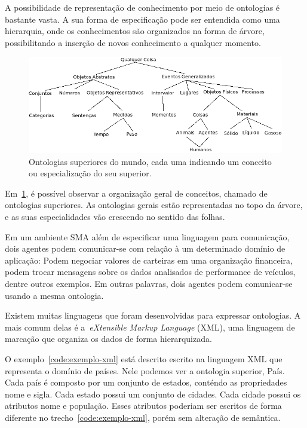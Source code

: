 A possibilidade de representação de conhecimento por meio de ontologias é bastante vasta. A sua forma de especificação pode ser entendida como uma hierarquia, onde os conhecimentos são organizados na forma de árvore, possibilitando a inserção de novos conhecimento a qualquer momento.

\begin{figure}
	\centering
	\includegraphics[scale=0.65]{images/arvore-ontologia.png}
	\caption{Ontologias superiores do mundo, cada uma indicando um conceito ou especialização do seu superior.}
	\label{fig:arvore-ontologia}
\end{figure}

Em~\ref{fig:arvore-ontologia}, é possível observar a organização geral de conceitos, chamado de ontologias superiores. As ontologias gerais estão representadas no topo da árvore, e as suas especialidades vão crescendo no sentido das folhas.

Em um ambiente SMA além de especificar uma linguagem para comunicação, dois agentes podem comunicar-se com relação à um determinado domínio de aplicação: Podem negociar valores de carteiras em uma organização financeira, podem trocar mensagens sobre os dados analisados de performance de veículos, dentre outros exemplos. Em outras palavras, dois agentes podem comunicar-se usando a mesma ontologia.

Existem muitas linguagens que foram desenvolvidas para expressar ontologias. A mais comum delas é a~\emph{eXtensible Markup Language} (XML), uma linguagem de marcação que organiza os dados de forma hierarquizada.

O exemplo~\ref{code:exemplo-xml} está descrito escrito na linguagem XML que representa o domínio de países. Nele podemos ver a ontologia superior, País. Cada país é composto por um conjunto de estados, conténdo as propriedades nome e sigla. Cada estado possui um conjunto de cidades. Cada cidade possui os atributos nome e população. Esses atributos poderiam ser escritos de forma diferente no trecho~\ref{code:exemplo-xml}, porém sem alteração de semântica.


